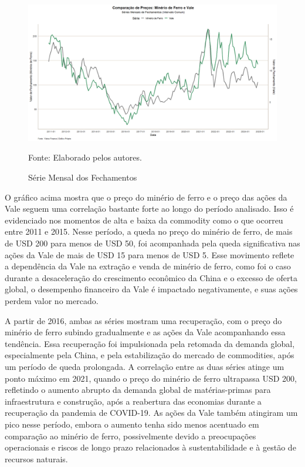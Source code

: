 \documentclass[a4paper,12pt]{article}[abntex2]
\begin{document}
\begin{figure}[H]
    \centering
    \caption{Série Mensal dos Fechamentos} 
    \includegraphics[width=1.0\textwidth]{APS 2/i1qC.png}
    \label{fig:i1qC}
    
    \footnotesize{Fonte: Elaborado pelos autores.}
    \end{figure}
O gráfico acima mostra que o preço do minério de ferro e o preço das ações da Vale seguem uma correlação bastante forte ao longo do período analisado. Isso é evidenciado nos momentos de alta e baixa da commodity como o que ocorreu entre 2011 e 2015. Nesse período, a queda no preço do minério de ferro, de mais de USD 200 para menos de USD 50, foi acompanhada pela queda significativa nas ações da Vale de mais de USD 15 para menos de USD 5. Esse movimento reflete a dependência da Vale na extração e venda de minério de ferro, como foi o caso durante a desaceleração do crescimento econômico da China e o excesso de oferta global, o desempenho financeiro da Vale é impactado negativamente, e suas ações perdem valor no mercado.

A partir de 2016, ambas as séries mostram uma recuperação, com o preço do minério de ferro subindo gradualmente e as ações da Vale acompanhando essa tendência. Essa recuperação foi impulsionada pela retomada da demanda global, especialmente pela China, e pela estabilização do mercado de commodities, após um período de queda prolongada. A correlação entre as duas séries atinge um ponto máximo em 2021, quando o preço do minério de ferro ultrapassa USD 200, refletindo o aumento abrupto da demanda global de matérias-primas para infraestrutura e construção, após a reabertura das economias durante a recuperação da pandemia de COVID-19. As ações da Vale também atingiram um pico nesse período, embora o aumento tenha sido menos acentuado em comparação ao minério de ferro, possivelmente devido a preocupações operacionais e riscos de longo prazo relacionados à sustentabilidade e à gestão de recursos naturais.
\end{document}
